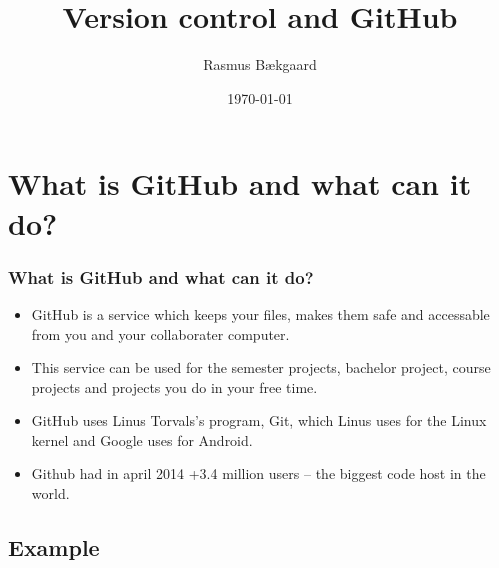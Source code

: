 \documentclass{beamer}
\begin{document}
\title{Version control and GitHub}  
\author{Rasmus Bækgaard}
\date{\today} 





\section{What is GitHub and what can it do?}
\frame
{
	\frametitle{What is GitHub and what can it do?}
	
\begin{itemize}
\item GitHub is a service which keeps your files, makes them safe and 
accessable from you and your collaborater computer.

\item This service can be used for the semester projects, bachelor project, 
course projects and projects you do in your free time.

\item GitHub uses Linus Torvals's program, Git, which Linus uses for the Linux 
kernel and Google uses for Android.

\item Github had in april 2014 +3.4 million users -- the biggest code host in 
the world.
\end{itemize}

}

\subsection{Example}

\end{document}
